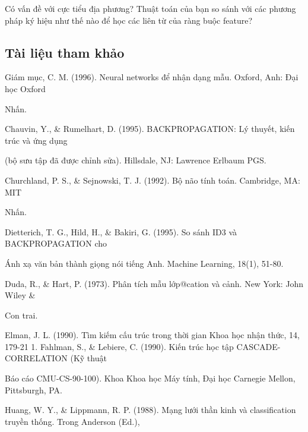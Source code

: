 Có vấn đề với cực tiểu địa phương? Thuật toán của bạn so sánh với các phương pháp ký hiệu như thế nào để học các liên từ của ràng buộc feature?

\subsection{Tài liệu tham khảo}

Giám mục, C. M. (1996). Neural networks để nhận dạng mẫu. Oxford, Anh: Đại học Oxford

Nhấn.

Chauvin, Y., \& Rumelhart, D. (1995). BACKPROPAGATION: Lý thuyết, kiến ​​trúc và ứng dụng

(bộ sưu tập đã được chỉnh sửa). Hillsdale, NJ: Lawrence Erlbaum PGS.

Churchland, P. S., \& Sejnowski, T. J. (1992). Bộ não tính toán. Cambridge, MA: MIT

Nhấn.

Dietterich, T. G., Hild, H., \& Bakiri, G. (1995). So sánh ID3 và BACKPROPAGATION cho

Ánh xạ văn bản thành giọng nói tiếng Anh. Machine Learning, 18(1), 51-80.

Duda, R., \& Hart, P. (1973). Phân tích mẫu lớp@cation và cảnh. New York: John Wiley \&

Con trai.

Elman, J. L. (1990). Tìm kiếm cấu trúc trong thời gian Khoa học nhận thức, 14, 179-21 1. Fahlman, S., \& Lebiere, C. (1990). Kiến trúc học tập CASCADE-CORRELATION (Kỹ thuật

Báo cáo CMU-CS-90-100). Khoa Khoa học Máy tính, Đại học Carnegie Mellon, Pittsburgh, PA.

Huang, W. Y., \& Lippmann, R. P. (1988). Mạng lưới thần kinh và classification truyền thống. Trong Anderson (Ed.),

